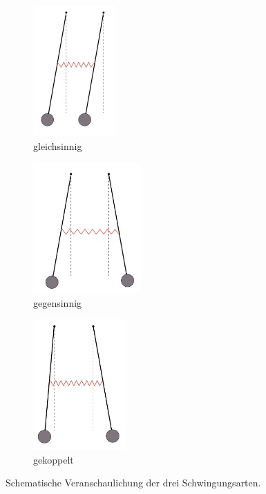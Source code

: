 \begin{figure}
    \begin{subfigure}{0.31\textwidth}
      \centering
      \includegraphics[height=5cm]{content/Bilder/Gleichsinnig.png}
      \caption{gleichsinnig}
      \label{fig:gleichsinnig}
    \end{subfigure}
    \hfill
    \begin{subfigure}{0.31\textwidth}
      \centering
      \includegraphics[height=5cm]{content/Bilder/Gegensinnig.png}
      \caption{gegensinnig}
      \label{fig:gegensinnig}
    \end{subfigure}
    \hfill
    \begin{subfigure}{0.31\textwidth}
      \centering
      \includegraphics[height=5cm]{content/Bilder/Gekoppelt.png}
      \caption{gekoppelt}
      \label{fig:gekoppelt}
    \end{subfigure}
    \caption{Schematische Veranschaulichung der drei Schwingungsarten.\,\cite{v106}}
    \label{fig:Schema Schwingungsarten}
  \end{figure}